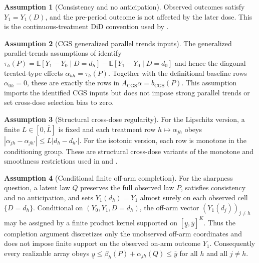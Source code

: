 \documentclass[11pt]{article}
\newcommand{\E}{\mathbb{E}}
\theoremstyle{definition}
\newtheorem{assumption}{Assumption}
\theoremstyle{plain}
\theoremstyle{remark}
\begin{document}
\begin{assumption}[Consistency and no anticipation]\label{ass:consistency-noanticip}
Observed outcomes satisfy \(Y_1=Y_1(D)\), and the pre-period outcome is not
affected by the later dose.  This is the continuous-treatment DiD convention
used by \cite{CallawayGoodmanBaconSantAnna2021}.
\end{assumption}

\begin{assumption}[CGS generalized parallel trends inputs]\label{ass:cgs-inputs}
The generalized parallel-trends assumptions of
\cite{CallawayGoodmanBaconSantAnna2021} identify
\(\tau_h(P)=\E[Y_1-Y_0\mid D=d_h]-\E[Y_1-Y_0\mid D=d_0]\) and hence the
diagonal treated-type effects \(\alpha_{hh}=\tau_h(P)\).  Together with the
definitional baseline rows \(\alpha_{0h}=0\), these are exactly the rows in
\(A_{\mathrm{CGS}}\alpha=b_{\mathrm{CGS}}(P)\).  This assumption imports the
identified CGS inputs but does not impose strong parallel trends or set
cross-dose selection bias to zero.
\end{assumption}

\begin{assumption}[Structural cross-dose regularity]\label{ass:regularity}
For the Lipschitz version, a finite \(L\in[0,\bar L]\) is fixed and each
treatment row \(h\mapsto\alpha_{j h}\) obeys
\(|\alpha_{j h}-\alpha_{j h'}|\le L|d_h-d_{h'}|\).  For the isotonic version,
each row is monotone in the conditioning group.  These are structural
cross-dose variants of the monotone and smoothness restrictions used in
\cite{ManskiPepper2000} and \cite{ArmstrongKolesar2018}.
\end{assumption}

\begin{assumption}[Conditional finite off-arm completion]\label{ass:completion}
For the sharpness question, a latent law \(Q\) preserves the full observed law
\(P\), satisfies consistency and no anticipation, and sets
\(Y_1(d_h)=Y_1\) almost surely on each observed cell \(\{D=d_h\}\).  Conditional
on \((Y_0,Y_1,D=d_h)\), the off-arm vector \((Y_1(d_j))_{j\neq h}\) may be
assigned by a finite product kernel supported on
\([\underline y,\overline y]^K\).  Thus the completion argument discretizes
only the unobserved off-arm coordinates and does not impose finite support on
the observed on-arm outcome \(Y_1\).  Consequently every realizable array obeys
\(\underline y\le \beta_h(P)+\alpha_{jh}(Q)\le\overline y\) for all
\(h\) and all \(j\neq h\).
\end{assumption}
\end{document}
